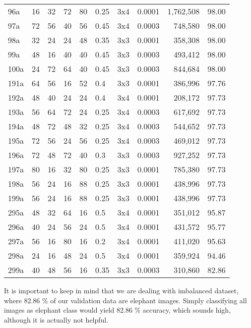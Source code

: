 \begin{table}
\begin{tabular}{llllllllrl}
       96a & 16 & 32 & 72 & 80 & 0.25 & 3x4 & 0.0001 & 1,762,508 & 98.00\\
       97a & 72 & 56 & 40 & 56 & 0.45 & 3x4 & 0.0003 &   748,580 & 98.00\\
       98a & 32 & 24 & 24 & 48 & 0.35 & 3x3 & 0.0001 &   358,308 & 98.00\\
       99a & 48 & 16 & 40 & 40 & 0.45 & 3x3 & 0.0003 &   493,412 & 98.00\\
      100a & 24 & 72 & 64 & 40 & 0.45 & 3x3 & 0.0003 &   844,684 & 98.00\\\midrule
      191a & 64 & 56 & 16 & 52 & 0.4  & 3x3 & 0.0001 &   386,996 & 97.76\\
      192a & 48 & 40 & 24 & 24 & 0.4  & 3x4 & 0.0001 &   208,172 & 97.73\\
      193a & 56 & 64 & 72 & 24 & 0.25 & 3x4 & 0.0003 &   617,692 & 97.73\\
      194a & 48 & 72 & 48 & 32 & 0.25 & 3x4 & 0.0003 &   544,652 & 97.73\\
      195a & 72 & 56 & 24 & 56 & 0.25 & 3x4 & 0.0003 &   469,012 & 97.73\\
      196a & 72 & 48 & 72 & 40 & 0.3  & 3x3 & 0.0003 &   927,252 & 97.73\\
      197a & 80 & 16 & 32 & 80 & 0.25 & 3x3 & 0.0001 &   785,380 & 97.73\\
      198a & 56 & 24 & 16 & 88 & 0.25 & 3x3 & 0.0001 &   438,996 & 97.73\\
      199a & 56 & 24 & 16 & 88 & 0.25 & 3x3 & 0.0001 &   438,996 & 97.73\\\midrule
      295a & 48 & 32 & 64 & 16 & 0.5  & 3x4 & 0.0001 &   351,012 & 95.87\\
      296a & 40 & 24 & 56 & 24 & 0.5  & 3x4 & 0.0001 &   431,572 & 95.77\\
      297a & 56 & 16 & 80 & 16 & 0.2  & 3x4 & 0.0001 &   411,020 & 95.63\\
      298a & 24 & 16 & 48 & 24 & 0.5  & 3x4 & 0.0001 &   359,924 & 94.46\\
      299a & 40 & 48 & 56 & 16 & 0.35 & 3x3 & 0.0003 &   310,860 & 82.86\\\bottomrule
    \end{tabular}
    \label{hyper_results1}
\end{table}

It is important to keep in mind that we are dealing with imbalanced dataset, where 82.86 \% of our validation data are elephant images.
Simply classifying all images as elephant class would yield 82.86 \% accuracy, which sounds high, although it is actually not helpful.

